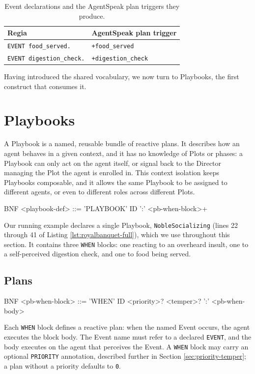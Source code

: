\begin{table}[h]
\centering
\begin{tabular}{|l|l|}
\hline
\textbf{Regia} & \textbf{AgentSpeak plan trigger} \\
\hline
\lstinline|EVENT food_served.| & \lstinline|+food_served| \\
\lstinline|EVENT digestion_check.| & \lstinline|+digestion_check| \\
\hline
\end{tabular}
\caption{Event declarations and the AgentSpeak plan triggers they produce.}
\label{tab:event-mapping}
\end{table}

Having introduced the shared vocabulary, we now turn to Playbooks, the first construct that consumes it.

\section{Playbooks}
\label{sec:playbooks}
A Playbook is a named, reusable bundle of reactive plans. It describes how an agent behaves in a given context, and it has no knowledge of Plots or phases: a Playbook can only act on the agent itself, or signal back to the Director managing the Plot the agent is enrolled in. This context isolation keeps Playbooks composable, and it allows the same Playbook to be assigned to different agents, or even to different roles across different Plots.

\begin{codeblock}[]{BNF}
    <playbook-def>   ::= 'PLAYBOOK' ID ':' <pb-when-block>+
\end{codeblock}

Our running example declares a single Playbook, \lstinline|NobleSocializing| (lines 22 through 41 of Listing \ref{lst:royalbanquet-full}), which we use throughout this section. It contains three \lstinline|WHEN| blocks: one reacting to an overheard insult, one to a self-perceived digestion check, and one to food being served.

\subsection{Plans}
\begin{codeblock}[]{BNF}
    <pb-when-block>  ::= 'WHEN' ID <priority>? <temper>? ':' <pb-when-body>
\end{codeblock}

Each \lstinline|WHEN| block defines a reactive plan: when the named Event occurs, the agent executes the block body. The Event name must refer to a declared \lstinline|EVENT|, and the body executes on the agent that perceives the Event. A \lstinline|WHEN| block may carry an optional \lstinline|PRIORITY| annotation, described further in Section \ref{sec:priority-temper}; a plan without a priority defaults to \lstinline|0|.


